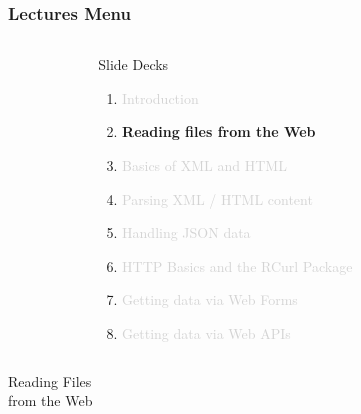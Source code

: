 \documentclass{beamer}\usepackage[]{graphicx}\usepackage[]{color}
\begin{document}
\begin{frame}
\frametitle{Lectures Menu}

\begin{columns}[t]
\begin{column}{0.1\textwidth}
\end{column}
\begin{column}{0.8\textwidth}
 \begin{block}{Slide Decks}
  \begin{enumerate}
   \item \textcolor{lightgray}{Introduction}
   \item \textbf{Reading files from the Web}
   \item \textcolor{lightgray}{Basics of XML and HTML}
   \item \textcolor{lightgray}{Parsing XML / HTML content}
   \item \textcolor{lightgray}{Handling JSON data}
   \item \textcolor{lightgray}{HTTP Basics and the RCurl Package}
   \item \textcolor{lightgray}{Getting data via Web Forms}
   \item \textcolor{lightgray}{Getting data via Web APIs}
  \end{enumerate}
 \end{block}
\end{column}
\begin{column}{0.1\textwidth}
\end{column}
\end{columns}

\end{frame}


\begin{frame}
 \begin{center}
  \Huge{\textcolor{mandarina}{Reading Files \\ from the Web}}
 \end{center}
\end{frame}

\end{document}
